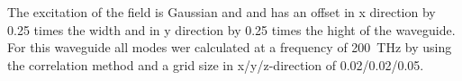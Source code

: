 The excitation of the field is Gaussian and and has an offset in x direction by 0.25 times the width and in y direction by 0.25 times the hight of the waveguide.
For this waveguide all modes wer calculated at a frequency of 200~THz by using the correlation method and a grid size in x/y/z-direction of 0.02/0.02/0.05. 

\begin{figure}[ht]
\centering
	\\%

\end{figure}
